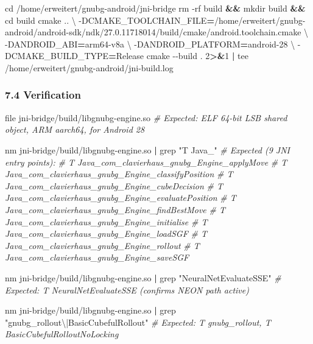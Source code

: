 \documentclass[11pt,a4paper]{article}
\newenvironment{Shaded}{%
  \setlength{\FrameSep}{4pt}%
  \definecolor{shadecolor}{RGB}{245,245,245}%
  \begin{snugshade}\footnotesize
}{\end{snugshade}}
\newcommand{\AttributeTok}[1]{\textcolor[rgb]{0.13,0.29,0.53}{#1}}
\newcommand{\BuiltInTok}[1]{#1}
\newcommand{\CommentTok}[1]{\textcolor[rgb]{0.56,0.35,0.01}{\textit{#1}}}
\newcommand{\DataTypeTok}[1]{\textcolor[rgb]{0.13,0.29,0.53}{#1}}
\newcommand{\DecValTok}[1]{\textcolor[rgb]{0.00,0.00,0.81}{#1}}
\newcommand{\FunctionTok}[1]{\textcolor[rgb]{0.13,0.29,0.53}{#1}}
\newcommand{\KeywordTok}[1]{\textcolor[rgb]{0.13,0.29,0.53}{\textbf{#1}}}
\newcommand{\NormalTok}[1]{#1}
\newcommand{\OperatorTok}[1]{\textcolor[rgb]{0.81,0.36,0.00}{\textbf{#1}}}
\newcommand{\StringTok}[1]{\textcolor[rgb]{0.31,0.60,0.02}{#1}}
\begin{document}
\begin{Shaded}
\begin{Highlighting}[]
\BuiltInTok{cd}\NormalTok{ /home/erweitert/gnubg{-}android/jni{-}bridge}
\FunctionTok{rm} \AttributeTok{{-}rf}\NormalTok{ build }\KeywordTok{\&\&} \FunctionTok{mkdir}\NormalTok{ build }\KeywordTok{\&\&} \BuiltInTok{cd}\NormalTok{ build}
\FunctionTok{cmake}\NormalTok{ .. }\DataTypeTok{\textbackslash{}}
  \AttributeTok{{-}DCMAKE\_TOOLCHAIN\_FILE}\OperatorTok{=}\NormalTok{/home/erweitert/gnubg{-}android/android{-}sdk/ndk/27.0.11718014/build/cmake/android.toolchain.cmake }\DataTypeTok{\textbackslash{}}
  \AttributeTok{{-}DANDROID\_ABI}\OperatorTok{=}\NormalTok{arm64{-}v8a }\DataTypeTok{\textbackslash{}}
  \AttributeTok{{-}DANDROID\_PLATFORM}\OperatorTok{=}\NormalTok{android{-}28 }\DataTypeTok{\textbackslash{}}
  \AttributeTok{{-}DCMAKE\_BUILD\_TYPE}\OperatorTok{=}\NormalTok{Release}
\FunctionTok{cmake} \AttributeTok{{-}{-}build}\NormalTok{ . }\DecValTok{2}\OperatorTok{\textgreater{}\&}\DecValTok{1} \KeywordTok{|} \FunctionTok{tee}\NormalTok{ /home/erweitert/gnubg{-}android/jni{-}build.log}
\end{Highlighting}
\end{Shaded}

\subsubsection{7.4 Verification}\label{verification}

\begin{Shaded}
\begin{Highlighting}[]
\FunctionTok{file}\NormalTok{ jni{-}bridge/build/libgnubg{-}engine.so}
\CommentTok{\# Expected: ELF 64{-}bit LSB shared object, ARM aarch64, for Android 28}

\FunctionTok{nm}\NormalTok{ jni{-}bridge/build/libgnubg{-}engine.so }\KeywordTok{|} \FunctionTok{grep} \StringTok{"T Java\_"}
\CommentTok{\# Expected (9 JNI entry points):}
\CommentTok{\#   T Java\_com\_clavierhaus\_gnubg\_Engine\_applyMove}
\CommentTok{\#   T Java\_com\_clavierhaus\_gnubg\_Engine\_classifyPosition}
\CommentTok{\#   T Java\_com\_clavierhaus\_gnubg\_Engine\_cubeDecision}
\CommentTok{\#   T Java\_com\_clavierhaus\_gnubg\_Engine\_evaluatePosition}
\CommentTok{\#   T Java\_com\_clavierhaus\_gnubg\_Engine\_findBestMove}
\CommentTok{\#   T Java\_com\_clavierhaus\_gnubg\_Engine\_initialise}
\CommentTok{\#   T Java\_com\_clavierhaus\_gnubg\_Engine\_loadSGF}
\CommentTok{\#   T Java\_com\_clavierhaus\_gnubg\_Engine\_rollout}
\CommentTok{\#   T Java\_com\_clavierhaus\_gnubg\_Engine\_saveSGF}

\FunctionTok{nm}\NormalTok{ jni{-}bridge/build/libgnubg{-}engine.so }\KeywordTok{|} \FunctionTok{grep} \StringTok{"NeuralNetEvaluateSSE"}
\CommentTok{\# Expected: T NeuralNetEvaluateSSE  (confirms NEON path active)}

\FunctionTok{nm}\NormalTok{ jni{-}bridge/build/libgnubg{-}engine.so }\KeywordTok{|} \FunctionTok{grep} \StringTok{"gnubg\_rollout\textbackslash{}|BasicCubefulRollout"}
\CommentTok{\# Expected: T gnubg\_rollout, T BasicCubefulRolloutNoLocking}
\end{Highlighting}
\end{Shaded}
\end{document}
